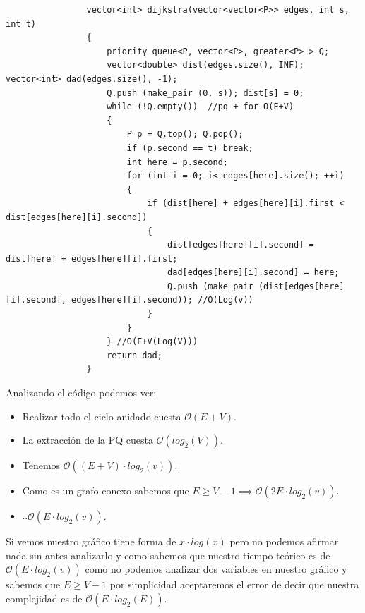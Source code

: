 \documentclass[letterpaper,11pt]{article}
\begin{document}
            \small{\begin{lstlisting}
                vector<int> dijkstra(vector<vector<P>> edges, int s, int t)
                {
                    priority_queue<P, vector<P>, greater<P> > Q;
                    vector<double> dist(edges.size(), INF); vector<int> dad(edges.size(), -1);
                    Q.push (make_pair (0, s)); dist[s] = 0;
                    while (!Q.empty())  //pq + for O(E+V)
                    {
                        P p = Q.top(); Q.pop();
                        if (p.second == t) break;
                        int here = p.second;
                        for (int i = 0; i< edges[here].size(); ++i) 
                        {
                            if (dist[here] + edges[here][i].first < dist[edges[here][i].second])
                            {
                                dist[edges[here][i].second] = dist[here] + edges[here][i].first;
                                dad[edges[here][i].second] = here;
                                Q.push (make_pair (dist[edges[here][i].second], edges[here][i].second)); //O(Log(v)) 
                            }
                        }
                    } //O(E+V(Log(V)))
                    return dad;
                }
            \end{lstlisting}} \normalsize

            Analizando el código podemos ver:
            \begin{itemize}
                \item Realizar todo el ciclo anidado cuesta $\mathcal{O}(E+V)$.
                \item La extracción de la PQ cuesta $\mathcal{O}(log_2(V))$.
                \item Tenemos $\mathcal{O}((E+V)\cdot log_2(v))$.
                \item Como es un grafo conexo sabemos que $E \geq V-1 \implies \mathcal{O}(2E\cdot log_2(v))$.
                \item $\therefore \mathcal{O}(E\cdot log_2(v))$.
            \end{itemize}

            Si vemos nuestro gráfico tiene forma de $x\cdot log(x)$ pero no podemos afirmar nada sin antes analizarlo y como sabemos que nuestro tiempo teórico es de $\mathcal{O}(E\cdot log_2(v))$ como no podemos analizar dos variables en nuestro gráfico y sabemos que $E \geq V-1$ por simplicidad aceptaremos el error de decir que nuestra complejidad es de $\mathcal{O}(E\cdot log_2(E))$.
        
\end{document}
